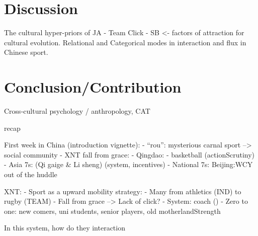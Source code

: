\section{Discussion}

The cultural hyper-priors of JA - Team Click - SB <- factors of attraction for cultural evolution.
Relational and Categorical modes in interaction and flux in Chinese sport.






\section{Conclusion/Contribution}
Cross-cultural psychology / anthropology, CAT

recap
































First week in China (introduction vignette):
- ``rou'': mysterious carnal sport --> social community
- XNT fall from grace:
- Qingdao:
    - basketball (actionScrutiny)
    - Asia 7s: (Qi gaige & Li sheng) (system, incentives)
    - National 7s: Beijing:WCY out of the huddle


XNT:
- Sport as a upward mobility strategy:
    - Many from athletics (IND) to rugby (TEAM)
- Fall from grace --> Lack of click?
- System: coach ()
- Zero to one: new comers, uni students, senior players, old motherlandStrength

In this system, how do they interaction
